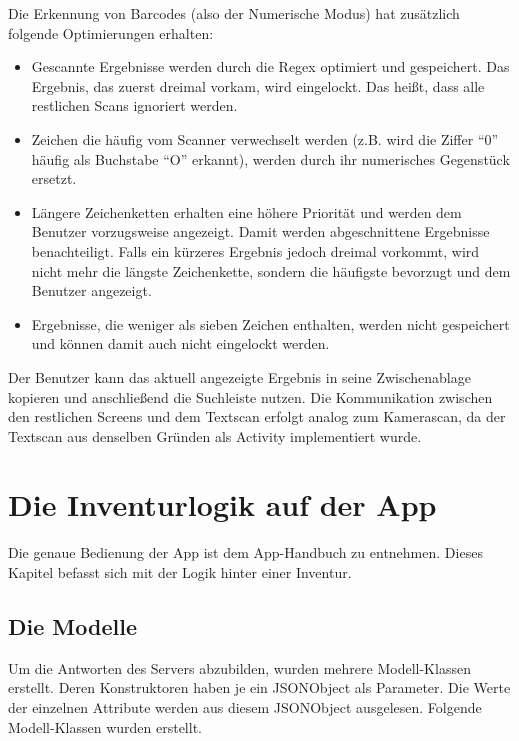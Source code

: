 Die Erkennung von Barcodes (also der Numerische Modus) hat zusätzlich
folgende Optimierungen erhalten:

\begin{itemize}
\tightlist
\item
  Gescannte Ergebnisse werden durch die Regex optimiert und gespeichert.
  Das Ergebnis, das zuerst dreimal vorkam, wird eingelockt. Das heißt,
  dass alle restlichen Scans ignoriert werden.
\item
  Zeichen die häufig vom Scanner verwechselt werden (z.B. wird die
  Ziffer ``0'' häufig als Buchstabe ``O'' erkannt), werden durch ihr
  numerisches Gegenstück ersetzt.
\item
  Längere Zeichenketten erhalten eine höhere Priorität und werden dem
  Benutzer vorzugsweise angezeigt. Damit werden abgeschnittene
  Ergebnisse benachteiligt. Falls ein kürzeres Ergebnis jedoch dreimal
  vorkommt, wird nicht mehr die längste Zeichenkette, sondern die
  häufigste bevorzugt und dem Benutzer angezeigt.
\item
  Ergebnisse, die weniger als sieben Zeichen enthalten, werden nicht
  gespeichert und können damit auch nicht eingelockt werden.
\end{itemize}

Der Benutzer kann das aktuell angezeigte Ergebnis in seine
Zwischenablage kopieren und anschließend die Suchleiste nutzen. Die
Kommunikation zwischen den restlichen Screens und dem Textscan erfolgt
analog zum Kamerascan, da der Textscan aus denselben Gründen als
Activity implementiert wurde.

\chapter{Die Inventurlogik auf der App}

Die genaue Bedienung der App ist dem App-Handbuch zu entnehmen. Dieses
Kapitel befasst sich mit der Logik hinter einer Inventur.

\hypertarget{die-modelle}{%
\section{Die Modelle}\label{die-modelle}}

Um die Antworten des Servers abzubilden, wurden mehrere Modell-Klassen
erstellt. Deren Konstruktoren haben je ein JSONObject als Parameter. Die
Werte der einzelnen Attribute werden aus diesem JSONObject ausgelesen.
Folgende Modell-Klassen wurden erstellt.


